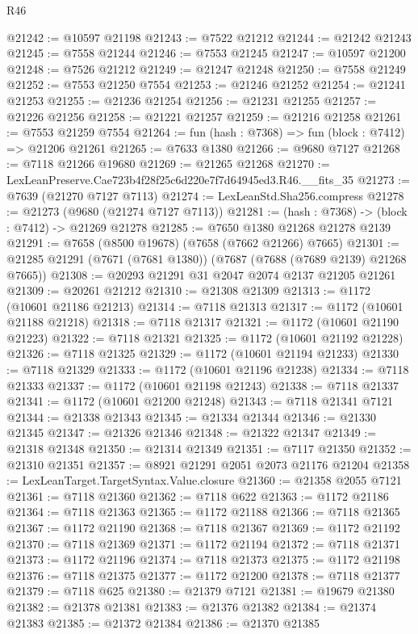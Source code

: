 \begin{lexlean}{R46}
\begin{coremodule}
@21242 := @10597 @21198
@21243 := @7522 @21212
@21244 := @21242 @21243
@21245 := @7558 @21244
@21246 := @7553 @21245
@21247 := @10597 @21200
@21248 := @7526 @21212
@21249 := @21247 @21248
@21250 := @7558 @21249
@21252 := @7553 @21250 @7554
@21253 := @21246 @21252
@21254 := @21241 @21253
@21255 := @21236 @21254
@21256 := @21231 @21255
@21257 := @21226 @21256
@21258 := @21221 @21257
@21259 := @21216 @21258
@21261 := @7553 @21259 @7554
@21264 := fun (hash : @7368) => fun (block : @7412) => @21206 @21261
@21265 := @7633 @1380
@21266 := @9680 @7127
@21268 := @7118 @21266 @19680
@21269 := @21265 @21268
@21270 := LexLeanPreserve.Cae723b4f28f25c6d220e7f7d64945ed3.R46.__fits_35
@21273 := @7639 (@21270 @7127 @7113)
@21274 := LexLeanStd.Sha256.compress
@21278 := @21273 (@9680 (@21274 @7127 @7113))
@21281 := (hash : @7368) -> (block : @7412) -> @21269 @21278
@21285 := @7650 @1380 @21268 @21278 @2139
@21291 := @7658 (@8500 @19678) (@7658 (@7662 @21266) @7665)
@21301 := @21285 @21291 (@7671 (@7681 @1380)) (@7687 (@7688 (@7689 @2139) @21268 @7665))
@21308 := @20293 @21291 @31 @2047 @2074 @2137 @21205 @21261
@21309 := @20261 @21212
@21310 := @21308 @21309
@21313 := @1172 (@10601 @21186 @21213)
@21314 := @7118 @21313
@21317 := @1172 (@10601 @21188 @21218)
@21318 := @7118 @21317
@21321 := @1172 (@10601 @21190 @21223)
@21322 := @7118 @21321
@21325 := @1172 (@10601 @21192 @21228)
@21326 := @7118 @21325
@21329 := @1172 (@10601 @21194 @21233)
@21330 := @7118 @21329
@21333 := @1172 (@10601 @21196 @21238)
@21334 := @7118 @21333
@21337 := @1172 (@10601 @21198 @21243)
@21338 := @7118 @21337
@21341 := @1172 (@10601 @21200 @21248)
@21343 := @7118 @21341 @7121
@21344 := @21338 @21343
@21345 := @21334 @21344
@21346 := @21330 @21345
@21347 := @21326 @21346
@21348 := @21322 @21347
@21349 := @21318 @21348
@21350 := @21314 @21349
@21351 := @7117 @21350
@21352 := @21310 @21351
@21357 := @8921 @21291 @2051 @2073 @21176 @21204
@21358 := LexLeanTarget.TargetSyntax.Value.closure
@21360 := @21358 @2055 @7121
@21361 := @7118 @21360
@21362 := @7118 @622
@21363 := @1172 @21186
@21364 := @7118 @21363
@21365 := @1172 @21188
@21366 := @7118 @21365
@21367 := @1172 @21190
@21368 := @7118 @21367
@21369 := @1172 @21192
@21370 := @7118 @21369
@21371 := @1172 @21194
@21372 := @7118 @21371
@21373 := @1172 @21196
@21374 := @7118 @21373
@21375 := @1172 @21198
@21376 := @7118 @21375
@21377 := @1172 @21200
@21378 := @7118 @21377
@21379 := @7118 @625
@21380 := @21379 @7121
@21381 := @19679 @21380
@21382 := @21378 @21381
@21383 := @21376 @21382
@21384 := @21374 @21383
@21385 := @21372 @21384
@21386 := @21370 @21385

\end{coremodule}
\end{lexlean}
